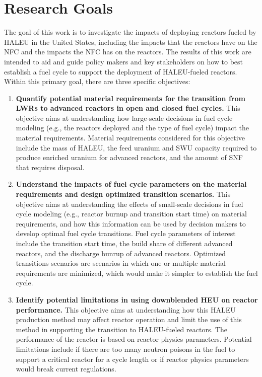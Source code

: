 \section{Research Goals}
The goal of this work is to investigate the impacts of deploying reactors 
fueled 
by \gls{HALEU} in the United States, including the impacts that the reactors 
have on the \gls{NFC} and the impacts the \gls{NFC} has on the reactors. 
The results of this work are intended to
aid and guide policy makers and key stakeholders on how to best establish a 
fuel cycle to support the deployment of \gls{HALEU}-fueled reactors. 
Within this primary goal, there are three specific objectives:
\vspace{0.2cm} 
\noindent
\begin{enumerate}
\item \textbf{Quantify potential material requirements for the transition 
from \glspl{LWR} to advanced reactors in open and closed 
fuel cycles.} This objective aims 
at understanding how large-scale decisions in fuel cycle 
modeling (e.g., the reactors deployed and the type of fuel cycle)
impact the material requirements. 
Material requirements considered for this objective include  
the mass of \gls{HALEU}, the feed uranium and \gls{SWU} capacity 
required to produce enriched uranium for advanced reactors, and 
the amount of \gls{SNF} that requires disposal. 

\item \textbf{Understand the impacts of fuel cycle parameters on the material 
requirements and design optimized transition scenarios.} 
This objective 
aims at understanding the effects of small-scale decisions in 
fuel cycle modeling (e.g., reactor burnup and transition start time)
on material requirements, and how this information can be used by 
decision makers to develop optimal fuel cycle transitions. Fuel cycle 
parameters of interest include the transition start time, the 
build share of different advanced reactors, and the discharge 
bunrup of advanced reactors. Optimized transitions scenarios are 
scenarios in which one or multiple material requirements are minimized, 
which would make it simpler to establish the fuel cycle. 

\item \textbf{Identify potential limitations in using downblended \gls{HEU} 
on reactor performance.}  This objective aims at understanding 
how this \gls{HALEU} production method may affect reactor operation 
and limit the use of this method in supporting the transition to 
\gls{HALEU}-fueled reactors. The performance of the reactor is based on 
reactor physics parameters. Potential limitations include if 
there are too many neutron poisons in the fuel to support a critical 
reactor for a cycle length or if reactor physics parameters 
would break current regulations.


\end{enumerate}
